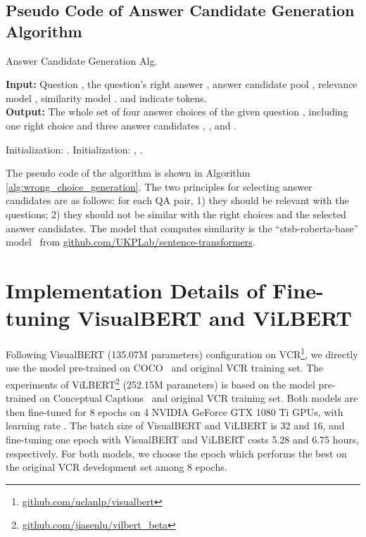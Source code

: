 \documentclass[11pt]{article}
\begin{document}
\subsection{Pseudo Code of Answer Candidate Generation Algorithm}
\begin{algorithm}[H]
    \small
    \caption{Answer Candidate Generation Alg.}
    \textbf{Input:} Question , the question's right answer , answer candidate pool , relevance model , similarity model .  and  indicate tokens. \\
    \textbf{Output:} The whole set of four answer choices  of the given question , including one right choice  and three answer candidates , , and . 
    \begin{algorithmic}[1]
     \State Initialization:   .
     \For{}
            \State Initialization:   ,   .
            \If {}
                    \State  
                    \If {}
                        \State  
                    \Else
                        \State  
                    \EndIf
                \EndFor
                \If {}
                    \State 
                    \State 
                \EndIf
            \EndIf
        \EndFor
        \State   
     \EndFor \\
     \Return 
    \end{algorithmic}
    \label{alg:wrong_choice_generation}
\end{algorithm}
\label{appendix:wrong_choice}
The pseudo code of the algorithm is shown in Algorithm \ref{alg:wrong_choice_generation}. The two principles for selecting answer candidates are as follows: for each QA pair, 1) they should be relevant with the questions; 2) they should not be similar with the right choices and the selected answer candidates. The model that computes similarity is the ``stsb-roberta-base'' model~\cite{reimers-2019-sentence-bert} from \url{github.com/UKPLab/sentence-transformers}.

\section{Implementation Details of Fine-tuning VisualBERT and ViLBERT}
\label{appendix:implementation}
Following VisualBERT (135.07M parameters) configuration on VCR\footnote{\url{github.com/uclanlp/visualbert}}, we directly use the model pre-trained on COCO~\cite{Chen2015MicrosoftCC} and original VCR training set. The experiments of ViLBERT\footnote{\url{github.com/jiasenlu/vilbert_beta}} (252.15M parameters) is based on the model pre-trained on Conceptual Captions~\cite{sharma-etal-2018-conceptual} and original VCR training set. Both models are then fine-tuned for 8 epochs on 4 NVIDIA GeForce GTX 1080 Ti GPUs, with learning rate . The batch size of VisualBERT and ViLBERT is 32 and 16, and fine-tuning one epoch with VisualBERT and ViLBERT costs 5.28 and 6.75 hours, respectively. For both models, we choose the epoch which performs the best on the original VCR development set among 8 epochs.
\end{document}
